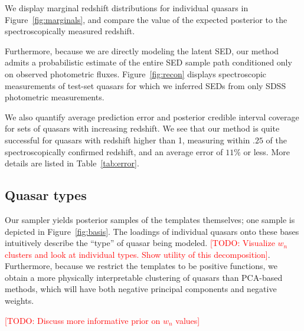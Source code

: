 \documentclass{article}
\newcommand{\red}[1]{\textcolor{red}{[TODO: #1]}}
\begin{document}
We display marginal redshift distributions for individual quasars in Figure~\ref{fig:marginals}, and compare the value of the expected posterior to the spectroscopically measured redshift. 

Furthermore, because we are directly modeling the latent SED, our method admits a probabilistic estimate of the entire SED sample path conditioned only on observed photometric fluxes.  Figure~\ref{fig:recon} displays spectroscopic measurements of test-set quasars for which we inferred SEDs from only SDSS photometric measurements.  

We also quantify average prediction error and posterior credible interval coverage for sets of quasars with increasing redshift.  We see that our method is quite successful for quasars with redshift higher than 1, measuring within $.25$ of the spectroscopically confirmed redshift, and an average error of $11 \%$ or less.  More details are listed in Table~\ref{tab:error}. 

\subsection{Quasar types}
Our sampler yields posterior samples of the templates themselves; one sample is depicted in Figure~\ref{fig:basis}.  The loadings of individual quasars onto these bases intuitively describe the ``type'' of quasar being modeled.  \red{Visualize $w_n$ clusters and look at individual types. Show utility of this decomposition}.  Furthermore, because we restrict the templates to be positive functions, we obtain a more physically interpretable clustering of quasars than PCA-based methods, which will have both negative principal components and negative weights.  

\red{Discuss more informative prior on $w_n$ values} 
\end{document}
